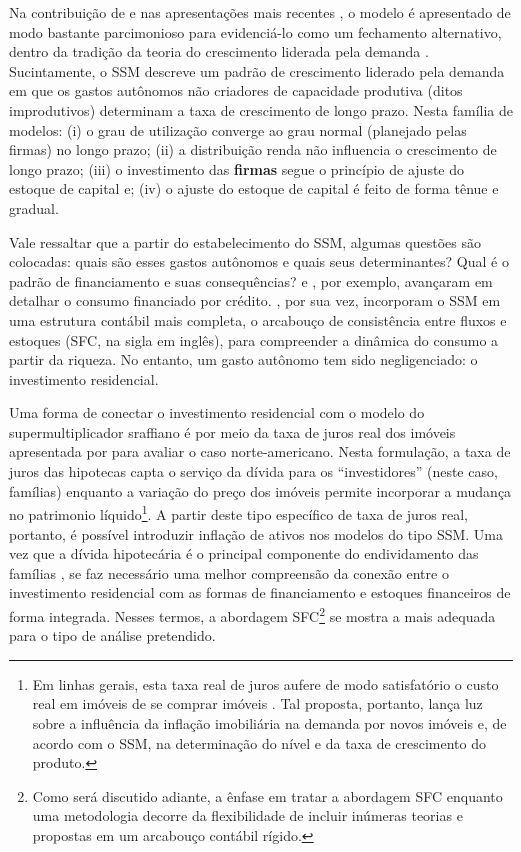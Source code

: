 Na contribuição de \textcite{serrano_sraffian_1995} e nas apresentações mais recentes \cite{freitas_growth_2015}, o modelo é apresentado de modo bastante parcimonioso para evidenciá-lo como um fechamento alternativo, dentro da tradição da teoria do crescimento liderada pela demanda \cite{serrano_sraffian_2017}. 
Sucintamente, o SSM descreve um padrão de crescimento liderado pela demanda em que os gastos autônomos não criadores de capacidade produtiva (ditos improdutivos) determinam a taxa de crescimento de longo prazo. 
Nesta família de modelos: 
(i) o grau de utilização converge ao grau normal (planejado pelas firmas) no longo prazo; 
(ii) a distribuição renda não influencia o crescimento de longo prazo; 
(iii) o investimento das \textbf{firmas} segue o princípio de ajuste do estoque de capital e;
(iv) o ajuste do estoque de capital é feito de forma tênue e gradual. 






Vale ressaltar que a partir do estabelecimento do SSM, algumas questões são colocadas: quais são esses gastos autônomos e quais seus determinantes? Qual é o padrão de financiamento e suas consequências? \textcite{pariboni_household_2016} e \textcite{fagundes_dinamica_2017}, por exemplo, avançaram em detalhar o consumo financiado por crédito.  \textcite{brochier_supermultiplier_2018}, por sua vez, incorporam o SSM em uma estrutura contábil mais completa, o arcabouço de consistência entre fluxos e estoques (SFC, na sigla em inglês), para compreender a dinâmica do consumo a partir da riqueza. No entanto, um gasto autônomo tem sido negligenciado: o investimento residencial. 

Uma forma de conectar o investimento residencial com o modelo do supermultiplicador sraffiano é por meio da taxa de juros real dos imóveis apresentada por \textcite{teixeira_crescimento_2015} para avaliar o caso norte-americano. Nesta formulação, a taxa de juros das hipotecas capta o serviço da dívida para os ``investidores'' (neste caso, famílias) enquanto a variação do preço dos imóveis permite incorporar a mudança no patrimonio líquido\footnote{Em linhas gerais, esta taxa real de juros aufere de modo satisfatório o custo real em imóveis de se comprar imóveis \cite[p.~53]{teixeira_crescimento_2015}. Tal proposta, portanto, lança luz sobre a influência da inflação imobiliária na demanda por novos imóveis e, de acordo com o SSM, na determinação do nível e da taxa de crescimento do produto.}. 
A partir deste tipo específico de taxa de juros real, portanto, é possível introduzir inflação de ativos nos modelos do tipo SSM. 
Uma vez que a dívida hipotecária é o principal componente do endividamento das famílias \cite{van_gunten_varieties_2018}, se faz necessário uma melhor compreensão da conexão entre o investimento residencial com as formas de financiamento e estoques financeiros de forma integrada.
Nesses termos, a abordagem SFC\footnote{Como será discutido adiante, a ênfase em tratar a abordagem SFC enquanto uma metodologia decorre da flexibilidade de incluir inúmeras teorias e propostas em um arcabouço contábil rígido. } se mostra a mais adequada para o tipo de análise pretendido. 


